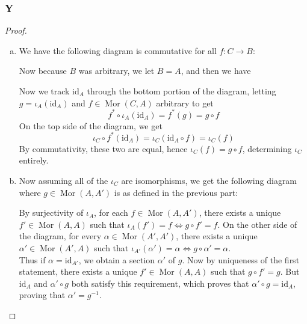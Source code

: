 \documentclass{article}
\newcommand{\id}{\mathrm{id}}
\DeclareMathOperator{\Mor}{\mathrm{Mor}}
\begin{document}
\subsubsection{Y}\label{1.3.Y}
\begin{proof}
    \begin{enumerate}[(a)]
        \item We have the following diagram is commutative for all $f:C\to B$:
        \begin{center}
        \end{center}
        Now because $B$ was arbitrary, we let $B=A$, and then we have
        \begin{center}
        \end{center}
        Now we track $\id_A$ through the bottom portion of the diagram, letting $g=\iota_A(\id_A)$ and $f\in \Mor(C,A)$ arbitrary to get
        \[
        f^*\circ \iota_A(\id_A)=f^*(g)=g\circ f
        \]
        On the top side of the diagram, we get
    \[
    \iota_C\circ f^*(\id_A)=\iota_C(\id_A\circ f)=\iota_C(f)
    \]
    By commutativity, these two are equal, hence $\iota_C(f)=g\circ f$, determining $\iota_C$ entirely.
    \item 
    Now assuming all of the $\iota_C$ are isomorphisms, we get the following diagram where $g\in \Mor(A,A')$ is as defined in the previous part:
    \begin{center}
        \end{center}
        By surjectivity of $\iota_A$, for each $f\in \Mor(A,A')$, there exists a unique $f'\in \Mor(A,A)$ such that $\iota_A(f')=f\iff g\circ f'=f$. On the other side of the diagram, for every $\alpha\in \Mor(A',A')$, there exists a unique $\alpha'\in \Mor(A',A)$ such that $\iota_{A'}(\alpha')=\alpha \iff g\circ \alpha'=\alpha$.\\
        \newline
        Thus if $\alpha=\id_{A'}$, we obtain a section $\alpha'$ of $g$. Now by uniqueness of the first statement, there exists a unique $f'\in \Mor(A,A)$ such that $g\circ f'=g$. But $\id_A$ and $\alpha' \circ g$ both satisfy this requirement, which proves that $\alpha'\circ g=\id_A$, proving that $\alpha'=g^{-1}$.
    \end{enumerate}
    
\end{proof}
\end{document}
